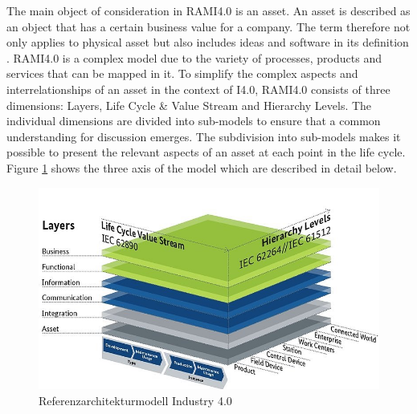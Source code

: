 The main object of consideration in \ac{RAMI4.0} is an asset. An asset is described as an object that has a certain business value for a company. The term therefore not only applies to physical asset but also includes ideas and software in its definition \cite[p. 31]{Heidel2017ReferenzarchitekturmodellIndustrie4.0Komponente}. \ac{RAMI4.0} is a complex model due to the variety of processes, products and services that can be mapped in it. To simplify the complex aspects and interrelationships of an asset in the context of \ac{I4.0}, \ac{RAMI4.0} consists of three dimensions: Layers, Life Cycle \& Value Stream and Hierarchy Levels. The individual dimensions are divided into sub-models to ensure that a common understanding for discussion emerges. The subdivision into sub-models makes it possible to present the relevant aspects of an asset at each point in the life cycle. Figure \ref{fig:rami40} shows the three axis of the model which are described in detail below.

\begin{figure}[h]
\includegraphics[scale=0.5]{content/pictures/rami_4.0_zvei.jpg}
\caption{Referenzarchitekturmodell Industry 4.0}
\label{fig:rami40}
\end{figure}

